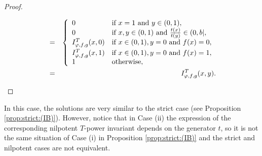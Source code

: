 \begin{proof}
\begin{itemize}
\begin{eqnarray*}
		&=&
		\left\{ \begin{array}{ll}
			0 &   \text{if }   x=1 \text{ and } y \in (0,1), \\
			0 &   \text{if }   x,y \in (0,1) \text{ and } \frac{t(x)}{t(y)} \in (0,b|, \\
			I^T_{\varphi,f,g}(x,0) &   \text{if }   x \in (0,1), y=0 \text{ and } f(x)=0, \\[3pt]
			I^T_{\varphi,f,g}(x,1) &   \text{if }   x \in (0,1), y=0 \text{ and } f(x)=1, \\
			1 & \text{otherwise}, 
		\end{array} \right.  \\
		&=& I^T_{\varphi,f,g}(x,y). 
	\end{eqnarray*}
	
\end{itemize}
\end{proof}

In this case, the solutions are very similar to the strict case (see Proposition \ref{prop:strict:(IB)}). However, notice that in Case (ii) the expression of the corresponding nilpotent $T$-power invariant depends on the generator $t$, so it is not the same situation of Case (i) in Proposition \ref{prop:strict:(IB)} and the strict and nilpotent cases are not equivalent.

